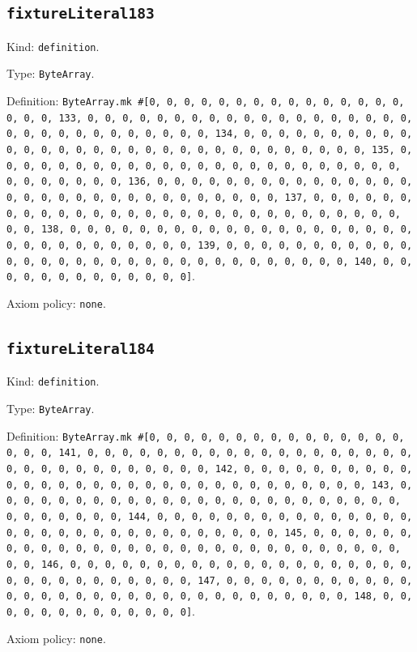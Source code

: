 \documentclass[11pt]{article}
\begin{document}
\subsection*{\texttt{fixtureLiteral183}}
\noindent Kind: \texttt{definition}.\par
\noindent Type: \texttt{ByteArray}.\par
\noindent Definition: \texttt{ByteArray.mk \#[0, 0, 0, 0, 0, 0, 0, 0, 0, 0, 0, 0, 0, 0, 0, 0, 0, 0, 133, 0, 0, 0, 0, 0, 0, 0, 0, 0, 0, 0, 0, 0, 0, 0, 0, 0, 0, 0, 0, 0, 0, 0, 0, 0, 0, 0, 0, 0, 0, 0, 134, 0, 0, 0, 0, 0, 0, 0, 0, 0, 0, 0, 0, 0, 0, 0, 0, 0, 0, 0, 0, 0, 0, 0, 0, 0, 0, 0, 0, 0, 0, 0, 135, 0, 0, 0, 0, 0, 0, 0, 0, 0, 0, 0, 0, 0, 0, 0, 0, 0, 0, 0, 0, 0, 0, 0, 0, 0, 0, 0, 0, 0, 0, 0, 136, 0, 0, 0, 0, 0, 0, 0, 0, 0, 0, 0, 0, 0, 0, 0, 0, 0, 0, 0, 0, 0, 0, 0, 0, 0, 0, 0, 0, 0, 0, 0, 137, 0, 0, 0, 0, 0, 0, 0, 0, 0, 0, 0, 0, 0, 0, 0, 0, 0, 0, 0, 0, 0, 0, 0, 0, 0, 0, 0, 0, 0, 0, 0, 138, 0, 0, 0, 0, 0, 0, 0, 0, 0, 0, 0, 0, 0, 0, 0, 0, 0, 0, 0, 0, 0, 0, 0, 0, 0, 0, 0, 0, 0, 0, 0, 139, 0, 0, 0, 0, 0, 0, 0, 0, 0, 0, 0, 0, 0, 0, 0, 0, 0, 0, 0, 0, 0, 0, 0, 0, 0, 0, 0, 0, 0, 0, 0, 140, 0, 0, 0, 0, 0, 0, 0, 0, 0, 0, 0, 0, 0]}.\par
\noindent Axiom policy: \texttt{none}.\par
\subsection*{\texttt{fixtureLiteral184}}
\noindent Kind: \texttt{definition}.\par
\noindent Type: \texttt{ByteArray}.\par
\noindent Definition: \texttt{ByteArray.mk \#[0, 0, 0, 0, 0, 0, 0, 0, 0, 0, 0, 0, 0, 0, 0, 0, 0, 0, 141, 0, 0, 0, 0, 0, 0, 0, 0, 0, 0, 0, 0, 0, 0, 0, 0, 0, 0, 0, 0, 0, 0, 0, 0, 0, 0, 0, 0, 0, 0, 0, 142, 0, 0, 0, 0, 0, 0, 0, 0, 0, 0, 0, 0, 0, 0, 0, 0, 0, 0, 0, 0, 0, 0, 0, 0, 0, 0, 0, 0, 0, 0, 0, 143, 0, 0, 0, 0, 0, 0, 0, 0, 0, 0, 0, 0, 0, 0, 0, 0, 0, 0, 0, 0, 0, 0, 0, 0, 0, 0, 0, 0, 0, 0, 0, 144, 0, 0, 0, 0, 0, 0, 0, 0, 0, 0, 0, 0, 0, 0, 0, 0, 0, 0, 0, 0, 0, 0, 0, 0, 0, 0, 0, 0, 0, 0, 0, 145, 0, 0, 0, 0, 0, 0, 0, 0, 0, 0, 0, 0, 0, 0, 0, 0, 0, 0, 0, 0, 0, 0, 0, 0, 0, 0, 0, 0, 0, 0, 0, 146, 0, 0, 0, 0, 0, 0, 0, 0, 0, 0, 0, 0, 0, 0, 0, 0, 0, 0, 0, 0, 0, 0, 0, 0, 0, 0, 0, 0, 0, 0, 0, 147, 0, 0, 0, 0, 0, 0, 0, 0, 0, 0, 0, 0, 0, 0, 0, 0, 0, 0, 0, 0, 0, 0, 0, 0, 0, 0, 0, 0, 0, 0, 0, 148, 0, 0, 0, 0, 0, 0, 0, 0, 0, 0, 0, 0, 0]}.\par
\noindent Axiom policy: \texttt{none}.\par
\end{document}
